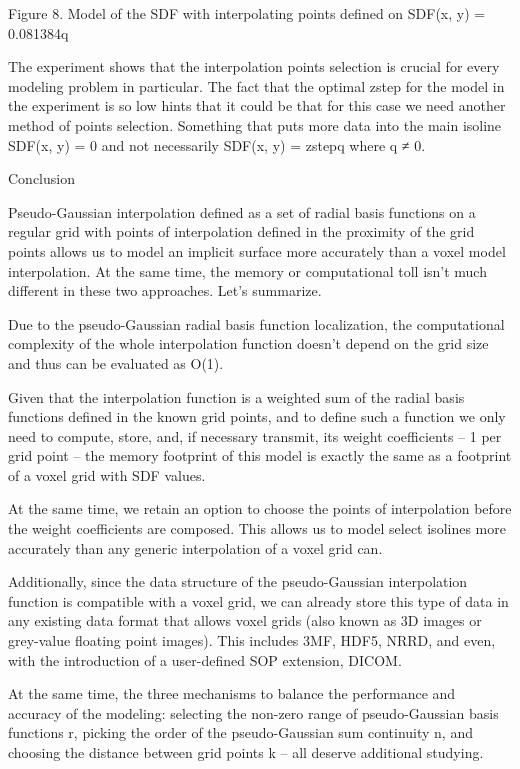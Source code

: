 \documentclass[12pt,a4paper]{article}
\begin{document}
\par
Figure 8. Model of the SDF with interpolating points defined on SDF(x, y) =  0.081384q
\par
The experiment shows that the interpolation points selection is crucial for every modeling problem in particular. The fact that the optimal zstep for the model in the experiment is so low hints that it could be that for this case we need another method of points selection. Something that puts more data into the main isoline SDF(x, y) = 0 and not necessarily SDF(x, y) = zstepq where q ≠ 0.
\par
Conclusion
\par
Pseudo-Gaussian interpolation defined as a set of radial basis functions on a regular grid with points of interpolation defined in the proximity of the grid points allows us to model an implicit surface more accurately than a voxel model interpolation. At the same time, the memory or computational toll isn’t much different in these two approaches. Let’s summarize.
\par
Due to the pseudo-Gaussian radial basis function localization, the computational complexity of the whole interpolation function doesn’t depend on the grid size and thus can be evaluated as O(1).
\par
Given that the interpolation function is a weighted sum of the radial basis functions defined in the known grid points, and to define such a function we only need to compute, store, and, if necessary transmit, its weight coefficients – 1 per grid point – the memory footprint of this model is exactly the same as a footprint of a voxel grid with SDF values.
\par
At the same time, we retain an option to choose the points of interpolation before the weight coefficients are composed. This allows us to model select isolines more accurately than any generic interpolation of a voxel grid can.
\par
Additionally, since the data structure of the pseudo-Gaussian interpolation function is compatible with a voxel grid, we can already store this type of data in any existing data format that allows voxel grids (also known as 3D images or grey-value floating point images). This includes 3MF, HDF5, NRRD, and even, with the introduction of a user-defined SOP extension, DICOM.
\par
At the same time, the three mechanisms to balance the performance and accuracy of the modeling: selecting the non-zero range of pseudo-Gaussian basis functions r, picking the order of the pseudo-Gaussian sum continuity n, and choosing the distance between grid points k – all deserve additional studying.
\end{document}
